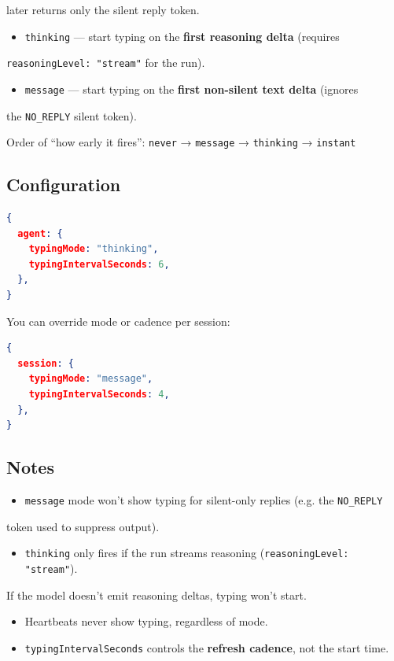 later returns only the silent reply token.
\begin{itemize}
  \item \texttt{thinking} — start typing on the \textbf{first reasoning delta} (requires
\end{itemize}

\texttt{reasoningLevel: "stream"} for the run).
\begin{itemize}
  \item \texttt{message} — start typing on the \textbf{first non-silent text delta} (ignores
\end{itemize}

the \texttt{NO\_REPLY} silent token).

Order of “how early it fires”:
\texttt{never} → \texttt{message} → \texttt{thinking} → \texttt{instant}

\subsection{Configuration}


\begin{lstlisting}[language=json]
{
  agent: {
    typingMode: "thinking",
    typingIntervalSeconds: 6,
  },
}
\end{lstlisting}


You can override mode or cadence per session:

\begin{lstlisting}[language=json]
{
  session: {
    typingMode: "message",
    typingIntervalSeconds: 4,
  },
}
\end{lstlisting}


\subsection{Notes}


\begin{itemize}
  \item \texttt{message} mode won’t show typing for silent-only replies (e.g. the \texttt{NO\_REPLY}
\end{itemize}

token used to suppress output).
\begin{itemize}
  \item \texttt{thinking} only fires if the run streams reasoning (\texttt{reasoningLevel: "stream"}).
\end{itemize}

If the model doesn’t emit reasoning deltas, typing won’t start.
\begin{itemize}
  \item Heartbeats never show typing, regardless of mode.
  \item \texttt{typingIntervalSeconds} controls the \textbf{refresh cadence}, not the start time.
\end{itemize}

